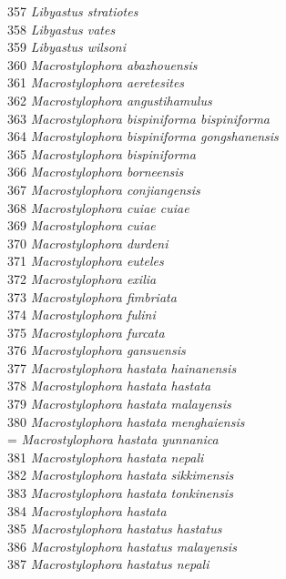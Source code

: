 \documentclass[
]{article}
\begin{document}
357 \emph{Libyastus stratiotes}\\
358 \emph{Libyastus vates}\\
359 \emph{Libyastus wilsoni}\\
360 \emph{Macrostylophora abazhouensis}\\
361 \emph{Macrostylophora aeretesites}\\
362 \emph{Macrostylophora angustihamulus}\\
363 \emph{Macrostylophora bispiniforma bispiniforma}\\
364 \emph{Macrostylophora bispiniforma gongshanensis}\\
365 \emph{Macrostylophora bispiniforma}\\
366 \emph{Macrostylophora borneensis}\\
367 \emph{Macrostylophora conjiangensis}\\
368 \emph{Macrostylophora cuiae cuiae}\\
369 \emph{Macrostylophora cuiae}\\
370 \emph{Macrostylophora durdeni}\\
371 \emph{Macrostylophora euteles}\\
372 \emph{Macrostylophora exilia}\\
373 \emph{Macrostylophora fimbriata}\\
374 \emph{Macrostylophora fulini}\\
375 \emph{Macrostylophora furcata}\\
376 \emph{Macrostylophora gansuensis}\\
377 \emph{Macrostylophora hastata hainanensis}\\
378 \emph{Macrostylophora hastata hastata}\\
379 \emph{Macrostylophora hastata malayensis}\\
380 \emph{Macrostylophora hastata menghaiensis}\\
= \emph{Macrostylophora hastata yunnanica}\\
381 \emph{Macrostylophora hastata nepali}\\
382 \emph{Macrostylophora hastata sikkimensis}\\
383 \emph{Macrostylophora hastata tonkinensis}\\
384 \emph{Macrostylophora hastata}\\
385 \emph{Macrostylophora hastatus hastatus}\\
386 \emph{Macrostylophora hastatus malayensis}\\
387 \emph{Macrostylophora hastatus nepali}\\
\end{document}
